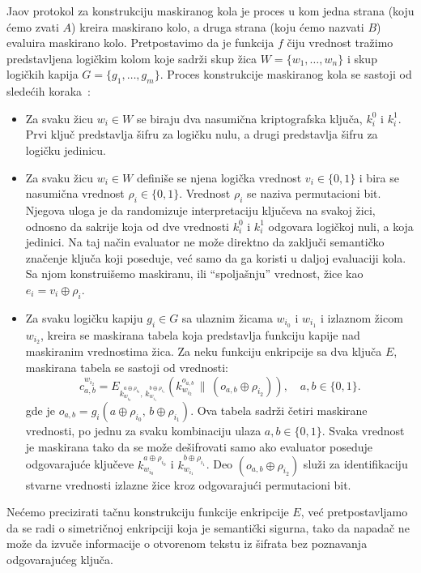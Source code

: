 Jaov protokol za konstrukciju maskiranog kola je proces u kom jedna strana (koju ćemo zvati $A$) kreira maskirano kolo, a druga strana (koju ćemo nazvati $B$) evaluira maskirano kolo. Pretpostavimo da je funkcija $f$ čiju vrednost tražimo predstavljena logičkim kolom koje sadrži skup žica $W = \{w_1,\ldots,w_n\}$ i skup logičkih kapija $G = \{g_1,\ldots,g_m\}$. Proces konstrukcije maskiranog kola se sastoji od sledećih koraka~\cite{smart2016cryptography}:

\begin{itemize}
    \item Za svaku žicu $w_i \in W$ se biraju dva nasumična kriptografska ključa, $k^0_i$ i $k^1_i$. Prvi ključ predstavlja šifru za logičku nulu, a drugi predstavlja šifru za logičku jedinicu.
    \item Za svaku žicu $w_i \in W$ definiše se njena logička vrednost $v_i \in \{0,1\}$ i bira se nasumična vrednost $\rho_i \in \{0, 1\}$. Vrednost $\rho_i$ se naziva permutacioni bit. Njegova uloga je da randomizuje interpretaciju ključeva na svakoj žici, odnosno da sakrije koja od dve vrednosti $k_i^0$ i $k_i^1$ odgovara logičkoj nuli, a koja jedinici. Na taj način evaluator ne može direktno da zaključi semantičko značenje ključa koji poseduje, već samo da ga koristi u daljoj evaluaciji kola. Sa njom konstruišemo maskiranu, ili ``spoljašnju'' vrednost, žice kao $e_i = v_i \oplus \rho_i$.
    \item Za svaku logičku kapiju $g_i \in G$ sa ulaznim žicama $w_{i_0}$ i $w_{i_1}$ i izlaznom žicom $w_{i_2}$, kreira se maskirana tabela koja predstavlja funkciju kapije nad maskiranim vrednostima žica. Za neku funkciju enkripcije sa dva ključa $E$, maskirana tabela se sastoji od vrednosti:
    \[
    c_{a,b}^{w_{i_2}} =
    E_{k_{w_{i_0}}^{a \oplus \rho_{i_0}},\,k_{w_{i_1}}^{b \oplus \rho_{i_1}}}
    \!\left(k_{w_{i_2}}^{o_{a,b}} \,\|\, (o_{a,b} \oplus \rho_{i_2})\right),
    \quad
    a,b\in\{0,1\}.
    \]
    gde je $o_{a,b}=g_i(a\oplus \rho_{i_0},\,b\oplus \rho_{i_1})$. Ova tabela sadrži četiri maskirane vrednosti, po jednu za svaku kombinaciju ulaza $a,b \in \{0,1\}$. Svaka vrednost je maskirana tako da se može dešifrovati samo ako evaluator poseduje odgovarajuće ključeve $k_{w_{i_0}}^{a \oplus \rho_{i_0}}$ i $k_{w_{i_1}}^{b \oplus \rho_{i_1}}$. Deo $(o_{a,b} \oplus \rho_{i_2})$ služi za identifikaciju stvarne vrednosti izlazne žice kroz odgovarajući permutacioni bit.
\end{itemize}

Nećemo precizirati tačnu konstrukciju funkcije enkripcije $E$, već pretpostavljamo da se radi o simetričnoj enkripciji koja je semantički sigurna, tako da napadač ne može da izvuče informacije o otvorenom tekstu iz šifrata bez poznavanja odgovarajućeg ključa.

